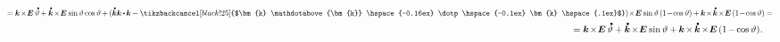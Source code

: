 \begin{otherlanguage}{russian}
\begin{multline*}
%
\scalebox{0.78}[0.82]{$= \bm{k} \hspace{-0.24ex}\times\hspace{-0.4ex} \UnitDyad \hspace{.4ex} \mathdotabove{\vartheta} \hspace{-0.1ex}
+ \mathdotabove{\bm{k}} \hspace{-0.24ex}\times\hspace{-0.4ex} \UnitDyad \hspace{.1ex} \operatorname{sin} \vartheta \operatorname{cos} \vartheta \hspace{-0.1ex}
+ \hspace{-0.16ex} ( \mathdotabove{\bm{k}} \bm{k} \hspace{-0.1ex} \dotp \hspace{-0.16ex} \bm{k} \hspace{-0.1ex} - \tikzbackcancel[black!25]{$\bm{k} \mathdotabove{\bm{k}} \hspace{-0.16ex} \dotp \hspace{-0.1ex} \bm{k} \hspace{.1ex}$} ) \hspace{-0.4ex}\times\hspace{-0.4ex} \UnitDyad \hspace{.1ex} \operatorname{sin} \vartheta \left({1 \!-\! \operatorname{cos} \vartheta}\right) \hspace{-0.1ex}
+ \hspace{-0.1ex} \bm{k} \hspace{-0.32ex}\times\hspace{-0.25ex}  \mathdotabove{\bm{k}} \hspace{-0.25ex}\times\hspace{-0.42ex} \UnitDyad \hspace{.32ex} ({1 \!-\! \operatorname{cos} \vartheta}) = $} \\
%
\shoveright{\hfill \hspace{11.2em}\scalebox{.96}[.96]{$= \bm{k} \hspace{-0.24ex}\times\hspace{-0.4ex} \UnitDyad \hspace{.4ex} \mathdotabove{\vartheta}
+ \mathdotabove{\bm{k}} \hspace{-0.24ex}\times\hspace{-0.4ex} \UnitDyad \hspace{.1ex} \operatorname{sin} \vartheta
+ \hspace{-0.1ex} \bm{k} \hspace{-0.2ex}\times\hspace{-0.2ex}  \mathdotabove{\bm{k}} \hspace{-0.2ex}\times\hspace{-0.4ex} \UnitDyad \hspace{.32ex} ({1 \hspace{-0.2ex} - \hspace{-0.2ex} \operatorname{cos} \vartheta})
\hspace{.1ex} .
$}}
\end{multline*}


\end{otherlanguage}
